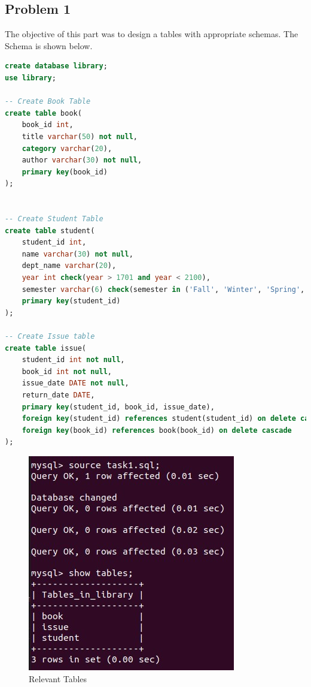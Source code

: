 \documentclass{article}
\begin{document}
\subsection{Problem 1}
The objective of this part was to design a tables with appropriate schemas. The Schema is shown below.
\begin{lstlisting}[language=sql]
create database library;
use library;

-- Create Book Table
create table book(
    book_id int,
    title varchar(50) not null,
    category varchar(20),
    author varchar(30) not null,
    primary key(book_id)
);


-- Create Student Table
create table student(
    student_id int,
    name varchar(30) not null,
    dept_name varchar(20),
    year int check(year > 1701 and year < 2100),
    semester varchar(6) check(semester in ('Fall', 'Winter', 'Spring', 'Summer')),
    primary key(student_id)
);

-- Create Issue table
create table issue(
    student_id int not null, 
    book_id int not null, 
    issue_date DATE not null, 
    return_date DATE,
    primary key(student_id, book_id, issue_date),
    foreign key(student_id) references student(student_id) on delete cascade,
    foreign key(book_id) references book(book_id) on delete cascade
);
\end{lstlisting}
\begin{figure}[!ht]
  \begin{center}
    \includegraphics[scale=0.6]{1.jpg}
  \caption{Relevant Tables}
  \end{center}
\end{figure}
\end{document}
